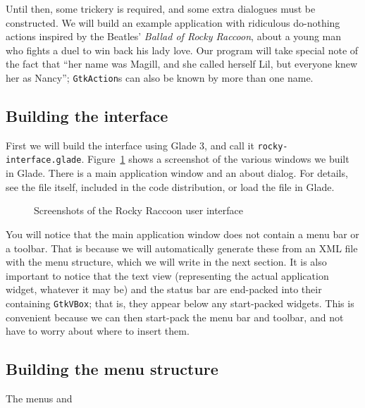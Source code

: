 \documentclass[%
			   halfparskip,smallheadings,pointlessnumbers]%
			   {scrartcl} %
\begin{document}
Until then, some trickery is required, and some extra dialogues must be constructed. We will build an example application with ridiculous do-nothing actions inspired by the Beatles' \emph{Ballad of Rocky Raccoon}, about a young man who fights a duel to win back his lady love. Our program will take special note of the fact that ``her name was Magill, and she called herself Lil, but everyone knew her as Nancy''; \lstinline$GtkAction$s can also be known by more than one name.

\subsection{Building the interface}

First we will build the interface using Glade 3, and call it \texttt{rocky-interface.glade}. Figure~\ref{fig:rocky-interface-screenshot} shows a screenshot of the various windows we built in Glade. There is a main application window and an about dialog. For details, see the file itself, included in the code distribution, or load the file in Glade.

\begin{figure}
\caption{Screenshots of the Rocky Raccoon user interface} \label{fig:rocky-interface-screenshot}
\end{figure}

You will notice that the main application window does not contain a menu bar or a toolbar. That is because we will automatically generate these from an XML file with the menu structure, which we will write in the next section. It is also important to notice that the text view (representing the actual application widget, whatever it may be) and the status bar are end-packed into their containing \lstinline$GtkVBox$; that is, they appear below any start-packed widgets. This is convenient because we can then start-pack the menu bar and toolbar, and not have to worry about where to insert them.

\subsection{Building the menu structure}

The menus and 






\end{document}
